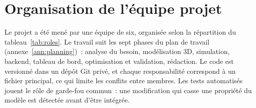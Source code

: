 \section{Organisation de l'équipe projet}

Le projet a été mené par une équipe de six, organisée selon la répartition du tableau~\ref{tab:roles}. Le travail suit les sept phases du plan de travail (annexe~\ref{ann:planning})~: analyse du besoin, modélisation \ac{3D}, simulation, backend, tableau de bord, optimisation et validation, rédaction. Le code est versionné dans un dépôt Git privé, et chaque responsabilité correspond à un fichier principal, ce qui limite les conflits entre membres. Les tests automatisés jouent le rôle de garde-fou commun~: une modification qui casse une propriété du modèle est détectée avant d'être intégrée.
